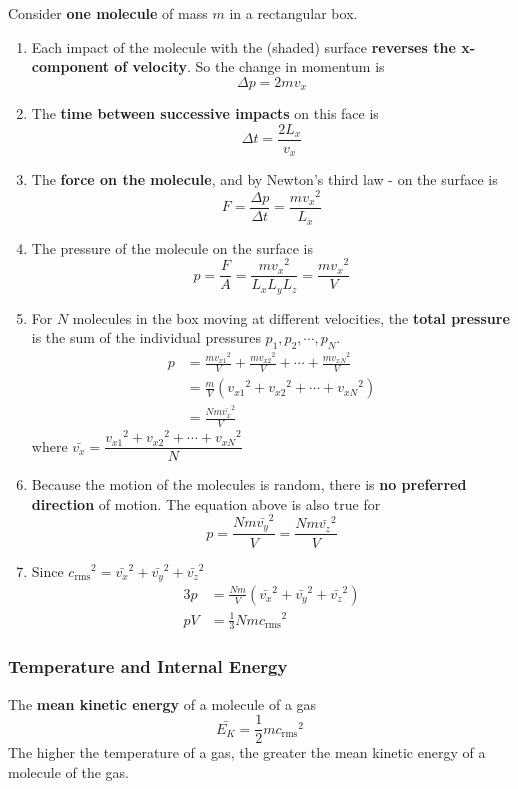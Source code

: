 Consider \textbf{one molecule} of mass $m$ in a rectangular box.
\begin{enumerate}
    \item Each impact of the molecule with the (shaded) surface \textbf{reverses the x-component of velocity}. So the change in momentum is
        $$\Delta p=2mv_x$$
    \item The \textbf{time between successive impacts} on this face is
        $$\Delta t=\frac{2L_x}{v_x}$$
    \item The \textbf{force on the molecule}, and by Newton's third law - on the surface is
        $$F=\frac{\Delta p}{\Delta t}=\frac{m{v_x}^2}{L_x}$$
    \item The pressure of the molecule on the surface is
        $$p=\frac{F}{A}=\frac{m{v_x}^2}{L_xL_yL_z}=\frac{m{v_x}^2}{V}$$
    \item For $N$ molecules in the box moving at different velocities, the \textbf{total pressure} is the sum of the individual pressures $p_1,p_2,\cdots,p_N$.
        \begin{align*}
            p&=\frac{m{v_{x1}}^2}{V}+\frac{m{v_{x2}}^2}{V}+\cdots+\frac{m{v_{xN}}^2}{V}\\
             &=\frac{m}{V}({v_{x1}}^2+{v_{x2}}^2+\cdots+{v_{xN}}^2)\\
             &=\frac{Nm\bar{v_x}^2}{V}
        \end{align*}
        where $\bar{v_x}=\dfrac{{v_{x1}}^2+{v_{x2}}^2+\cdots+{v_{xN}}^2}{N}$
    \item Because the motion of the molecules is random, there is \textbf{no preferred direction} of motion. The equation above is also true for
        $$p=\frac{Nm\bar{v_y}^2}{V}=\frac{Nm\bar{v_z}^2}{V}$$
    \item Since ${c_\text{rms}}^2=\bar{v_x}^2+\bar{v_y}^2+\bar{v_z}^2$
        \begin{align*}
            3p&=\frac{Nm}{V}(\bar{v_x}^2+\bar{v_y}^2+\bar{v_z}^2)\\
            pV&=\frac{1}{3}Nm{c_\text{rms}}^2
        \end{align*}
\end{enumerate}

\subsubsection*{Temperature and Internal Energy}

The \textbf{mean kinetic energy} of a molecule of a gas
$$\bar{E_K}=\frac{1}{2}m{c_\text{rms}}^2$$
The higher the temperature of a gas, the greater the mean kinetic energy of a molecule of the gas.

